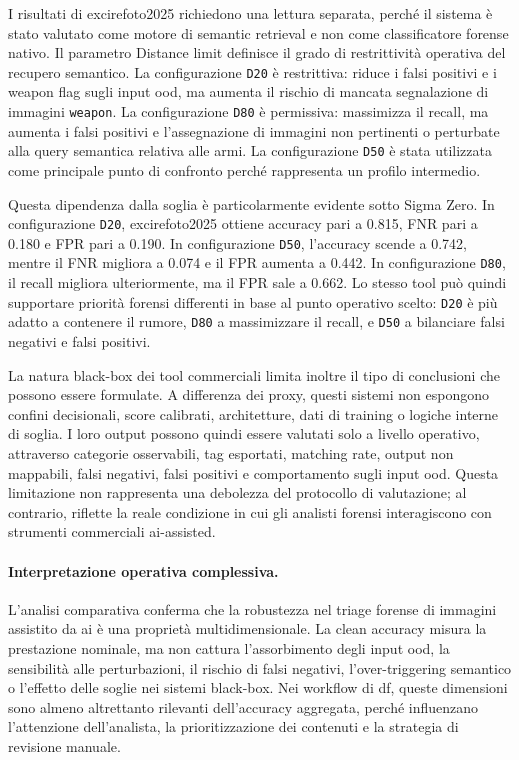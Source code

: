 I risultati di \gls{excirefoto2025} richiedono una lettura separata, perché il
sistema è stato valutato come motore di semantic retrieval e non come
classificatore forense nativo. Il parametro Distance limit definisce il grado di
restrittività operativa del recupero semantico. La configurazione \texttt{D20} è
restrittiva: riduce i falsi positivi e i weapon flag sugli input \gls{ood}, ma
aumenta il rischio di mancata segnalazione di immagini \texttt{weapon}. La
configurazione \texttt{D80} è permissiva: massimizza il recall, ma aumenta i
falsi positivi e l'assegnazione di immagini non pertinenti o perturbate alla
query semantica relativa alle armi. La configurazione \texttt{D50} è stata
utilizzata come principale punto di confronto perché rappresenta un profilo
intermedio.

Questa dipendenza dalla soglia è particolarmente evidente sotto Sigma Zero. In
configurazione \texttt{D20}, \gls{excirefoto2025} ottiene accuracy pari a 0.815,
FNR pari a 0.180 e FPR pari a 0.190. In configurazione \texttt{D50}, l'accuracy
scende a 0.742, mentre il FNR migliora a 0.074 e il FPR aumenta a 0.442. In
configurazione \texttt{D80}, il recall migliora ulteriormente, ma il FPR sale a
0.662. Lo stesso tool può quindi supportare priorità forensi differenti in base
al punto operativo scelto: \texttt{D20} è più adatto a contenere il rumore,
\texttt{D80} a massimizzare il recall, e \texttt{D50} a bilanciare falsi
negativi e falsi positivi.

La natura black-box dei tool commerciali limita inoltre il tipo di conclusioni
che possono essere formulate. A differenza dei proxy, questi sistemi non
espongono confini decisionali, score calibrati, architetture, dati di training o
logiche interne di soglia. I loro output possono quindi essere valutati solo a
livello operativo, attraverso categorie osservabili, tag esportati, matching
rate, output non mappabili, falsi negativi, falsi positivi e comportamento sugli
input \gls{ood}. Questa limitazione non rappresenta una debolezza del protocollo
di valutazione; al contrario, riflette la reale condizione in cui gli analisti
forensi interagiscono con strumenti commerciali \gls{ai}-assisted.

\paragraph{Interpretazione operativa complessiva.}

L'analisi comparativa conferma che la robustezza nel triage forense di immagini
assistito da \gls{ai} è una proprietà multidimensionale. La clean accuracy misura
la prestazione nominale, ma non cattura l'assorbimento degli input \gls{ood}, la
sensibilità alle perturbazioni, il rischio di falsi negativi, l'over-triggering
semantico o l'effetto delle soglie nei sistemi black-box. Nei workflow di
\gls{df}, queste dimensioni sono almeno altrettanto rilevanti dell'accuracy
aggregata, perché influenzano l'attenzione dell'analista, la prioritizzazione dei
contenuti e la strategia di revisione manuale.

